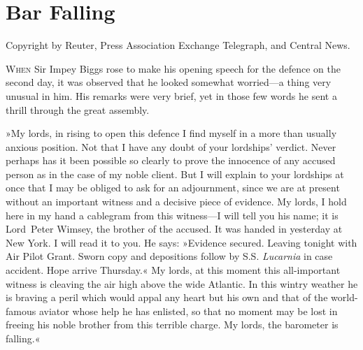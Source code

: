 
\chapter{Bar Falling}

\epigraph{Copyright by Reuter, Press Association Exchange Telegraph, and Central News.}{}


\lettrine[lines=4]{W}{hen} Sir Impey Biggs rose to make his opening speech for the defence on the second day, it was observed that he looked somewhat worried—a thing very unusual in him. His remarks were very brief, yet in those few words he sent a thrill through the great assembly.

»My lords, in rising to open this defence I find myself in a more than usually anxious position. Not that I have any doubt of your lordships' verdict. Never perhaps has it been possible so clearly to prove the innocence of any accused person as in the case of my noble client. But I will explain to your lordships at once that I may be obliged to ask for an adjournment, since we are at present without an important witness and a decisive piece of evidence. My lords, I hold here in my hand a cablegram from this witness—I will tell you his name; it is Lord~Peter Wimsey, the brother of the accused. It was handed in yesterday at New York. I will read it to you. He says: »Evidence secured. Leaving tonight with Air Pilot Grant. Sworn copy and depositions follow by S\@.S\@. \textit{Lucarnia} in case accident. Hope arrive Thursday.« My lords, at this moment this all-important witness is cleaving the air high above the wide Atlantic. In this wintry weather he is braving a peril which would appal any heart but his own and that of the world-famous aviator whose help he has enlisted, so that no moment may be lost in freeing his noble brother from this terrible charge. My lords, the barometer is falling.«

